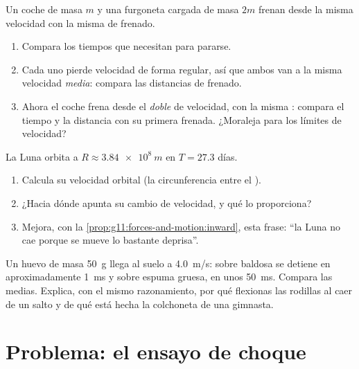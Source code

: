 \begin{exercise}[$\star\star\star$]\label{exo:g11:forces-and-motion:13}
Un coche de masa $m$ y una furgoneta cargada de masa $2m$ frenan desde
la misma velocidad con la misma  de frenado.
\begin{enumerate}
  \item Compara los tiempos que necesitan para pararse.
  \item Cada uno pierde velocidad de forma regular, así que ambos van a
        la misma velocidad \emph{media}: compara las distancias de
        frenado.
  \item Ahora el coche frena desde el \emph{doble} de velocidad, con la
        misma : compara el tiempo y la distancia con su primera
        frenada. ¿Moraleja para los límites de velocidad?
\end{enumerate}
\end{exercise}

\begin{exercise}[$\star\star\star$]\label{exo:g11:forces-and-motion:14}
La Luna orbita a $R \approx \qty{3.84e8}{m}$ en $T = \num{27.3}$ días.
\begin{enumerate}
  \item Calcula su velocidad orbital (la circunferencia entre el
        ).
  \item ¿Hacia dónde apunta su cambio de velocidad, y qué  lo
        proporciona?
  \item Mejora, con la \cref{prop:g11:forces-and-motion:inward}, esta
        frase: ``la Luna no cae porque se mueve lo bastante deprisa''.
\end{enumerate}
\end{exercise}

\begin{exercise}[$\star\star\star$]\label{exo:g11:forces-and-motion:15}
Un huevo de masa \qty{50}{g} llega al suelo a \qty{4.0}{m/s}: sobre
baldosa se detiene en aproximadamente \qty{1}{ms} y sobre espuma gruesa,
en unos \qty{50}{ms}. Compara las  medias. Explica, con el mismo
razonamiento, por qué flexionas las rodillas al caer de un salto y de
qué está hecha la colchoneta de una gimnasta.
\end{exercise}

\section{Problema: el ensayo de choque}

